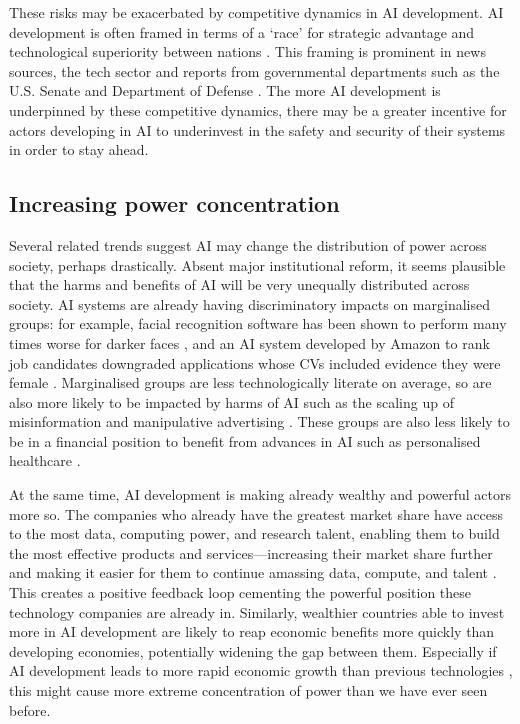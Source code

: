 \documentclass{article}
\begin{document}
These risks may be exacerbated by competitive dynamics in AI development. AI development is often framed in terms of a ‘race’ for strategic advantage and technological superiority between nations \citep{cave_ai_2018}. This framing is prominent in news sources, the tech sector and reports from governmental departments such as the U.S. Senate and Department of Defense \citep{imbrie_mainframes_2020}. The more AI development is underpinned by these competitive dynamics, there may be a greater incentive for actors developing in AI to underinvest in the safety and security of their systems in order to stay ahead.

\subsection{Increasing power concentration}

Several related trends suggest AI may change the distribution of power across society, perhaps drastically. 
Absent major institutional reform, it seems plausible that the harms and benefits of AI will be very unequally distributed across society. AI systems are already having discriminatory impacts on marginalised groups: for example, facial recognition software has been shown to perform many times worse for darker faces \citep{raji_actionable_2019}, and an AI system developed by Amazon to rank job candidates downgraded applications whose CVs included evidence they were female \citep{west_discriminating_2019}. Marginalised groups are less technologically literate on average, so are also more likely to be impacted by harms of AI such as the scaling up of misinformation and manipulative advertising \citep{lutz_digital_2019}. These groups are also less likely to be in a financial position to benefit from advances in AI such as personalised healthcare \citep{west_discriminating_2019}.

At the same time, AI development is making already wealthy and powerful actors more so. The companies who already have the greatest market share have access to the most data, computing power, and research talent, enabling them to build the most effective products and services---increasing their market share further and making it easier for them to continue amassing data, compute, and talent \citep{dafoe_ai_2018,kalluri_dont_2020,lee_ai_2018}. This creates a positive feedback loop cementing the powerful position these technology companies are already in. Similarly, wealthier countries able to invest more in AI development are likely to reap economic benefits more quickly than developing economies, potentially widening the gap between them. Especially if AI development leads to more rapid economic growth than previous technologies \citep{agrawal_artificial_2019}, this might cause more extreme concentration of power than we have ever seen before.
\end{document}
